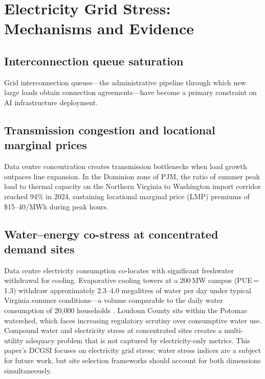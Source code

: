 \documentclass[preprint,12pt]{elsarticle}
\begin{document}
\section{Electricity Grid Stress: Mechanisms and Evidence}
\label{sec:gridstress}

\subsection{Interconnection queue saturation}
\label{subsec:queue}

Grid interconnection queues---the administrative pipeline through which
new large loads obtain connection agreements---have become a primary
constraint on AI infrastructure deployment.

\subsection{Transmission congestion and locational marginal prices}
\label{subsec:congestion}

Data centre concentration creates transmission bottlenecks when load
growth outpaces line expansion. In the Dominion zone of PJM, the ratio
of summer peak load to thermal capacity on the Northern Virginia to
Washington import corridor reached 94\% in 2024, sustaining locational
marginal price (LMP) premiums of \$15--40/MWh during peak hours.

\subsection{Water--energy co-stress at concentrated demand sites}
\label{subsec:water}

Data centre electricity consumption co-locates with significant freshwater
withdrawal for cooling. Evaporative cooling towers at a 200\,MW campus
(PUE\,=\,1.3) withdraw approximately 2.3--4.0 megalitres of water per
day under typical Virginia summer conditions---a volume comparable to
the daily water consumption of 20{,}000 households \cite{mytton2021water}.
Loudoun County sits within the Potomac watershed, which faces increasing
regulatory scrutiny over consumptive water use. Compound water and
electricity stress at concentrated sites creates a multi-utility
adequacy problem that is not captured by electricity-only metrics.
This paper's DCGSI focuses on electricity grid stress; water stress
indices are a subject for future work, but site selection frameworks
should account for both dimensions simultaneously.
\end{document}
